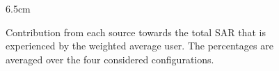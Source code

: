 \def\angle{0}
\def\radius{3}
\def\cyclelist{{"c_myue","c_otheruabs","c_myuabs","c_otherue"}}
\newcount\cyclecount {}
\newcount\ind {}
\begin{figure}[h!]
\centering
 \resizebox {!} {6.5cm} {
 }
\caption{Contribution from each source towards the total SAR that is experienced by the weighted average user. 
The percentages are averaged over the four 
considered configurations.}
\label{fig:pie}
\end{figure}

